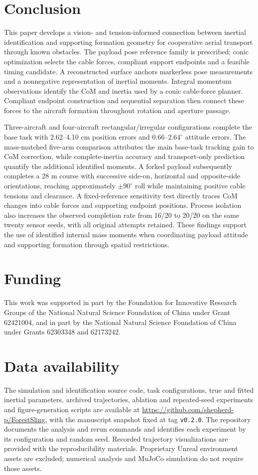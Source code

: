 \section{Conclusion}
This paper develops a vision- and tension-informed connection between inertial identification and supporting formation geometry for cooperative aerial transport through known obstacles. The payload pose reference family is prescribed; conic optimization selects the cable forces, compliant support endpoints and a feasible timing candidate. A reconstructed surface anchors markerless pose measurements and a nonnegative representation of inertial moments. Integral momentum observations identify the CoM and inertia used by a conic cable-force planner. Compliant endpoint construction and sequential separation then connect these forces to the aircraft formation throughout rotation and aperture passage.

Three-aircraft and four-aircraft rectangular/irregular configurations complete the base task with 2.62--4.10 cm position errors and $0.66$--$2.64^\circ$ attitude errors. The mass-matched five-arm comparison attributes the main base-task tracking gain to CoM correction, while complete-inertia accuracy and transport-only prediction quantify the additional identified moments. A forked payload subsequently completes a 28 m course with successive side-on, horizontal and opposite-side orientations, reaching approximately $\pm90^\circ$ roll while maintaining positive cable tensions and clearance. A fixed-reference sensitivity test directly traces CoM changes into cable forces and supporting endpoint positions. Process isolation also increases the observed completion rate from 16/20 to 20/20 on the same twenty sensor seeds, with all original attempts retained. These findings support the use of identified internal mass moments when coordinating payload attitude and supporting formation through spatial restrictions.

\section*{Funding}
This work was supported in part by the Foundation for Innovative Research Groups of the National Natural Science Foundation of China under Grant 62421004, and in part by the National Natural Science Foundation of China under Grants 62303348 and 62173242.

\section*{Data availability}
The simulation and identification source code, task configurations, true and fitted inertial parameters, archived trajectories, ablation and repeated-seed experiments and figure-generation scripts are available at \url{https://github.com/shepherd-p/ForestSling}, with the manuscript snapshot fixed at tag \texttt{v0.2.0}. The repository documents the analysis and rerun commands and identifies each experiment by its configuration and random seed. Recorded trajectory visualizations are provided with the reproducibility materials. Proprietary Unreal environment assets are excluded; numerical analysis and MuJoCo simulation do not require those assets.
